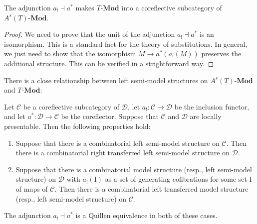 \documentclass[reqno]{amsart}
\theoremstyle{definition}
\theoremstyle{remark}
\newcommand{\fs}[1]{\mathrm{#1}}
\newcommand{\cat}[1]{\mathcal{#1}}
\newcommand{\C}{\cat{C}}
\newcommand{\D}{\cat{D}}
\newcommand{\Mod}[1]{#1\text{-}\mathbf{Mod}}
\newcommand{\I}{\fs{I}}
\numberwithin{figure}{section}
\begin{document}
\begin{prop}
The adjunction $a_! \dashv a^*$ makes $\Mod{T}$ into a coreflective subcategory of $\Mod{A^s(T)}$.
\end{prop}
\begin{proof}
We need to prove that the unit of the adjunction $a_! \dashv a^*$ is an isomorphism.
This is a standard fact for the theory of substitutions.
In general, we just need to show that the isomorphism $M \to a^*(a_!(M))$ preserves the additional structure.
This can be verified in a strightforward way.
\end{proof}

There is a close relationship between left semi-model structures on $\Mod{A^s(T)}$ and $\Mod{T}$:

\begin{prop}
Let $\C$ be a coreflective subcategory of $\D$, let $a_! : \C \to \D$ be the inclusion functor, and let $a^* : \D \to \C$ be the coreflector.
Suppose that $\C$ and $\D$ are locally presentable.
Then the following properties hold:
\begin{enumerate}
\item \label{it:coref-model-right}
Suppose that there is a combinatorial left semi-model structure on $\C$.
Then there is a combinatorial right transferred left semi-model structure on $\D$.
\item \label{it:coref-model-left}
Suppose that there is a combinatorial model structure (resp., left semi-model structure) on $\D$ with $a_!(\I)$ as a set of generating cofibrations for some set $\I$ of maps of $\C$.
Then there is a combinatorial left transferred model structure (resp., left semi-model structure) on $\C$.
\end{enumerate}
The adjunction $a_! \dashv a^*$ is a Quillen equivalence in both of these cases.
\end{prop}
\end{document}
